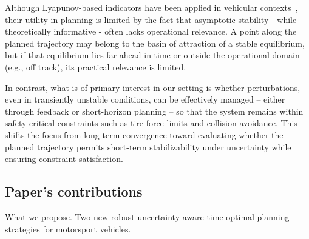 
Although Lyapunov-based indicators have been applied in vehicular contexts~\cite{Sadri:StabilityAnalysisNonlinear:2013,Meng:AnalysisGlobalCharacteristics:2022}, their utility in planning is limited by the fact that asymptotic stability - while theoretically informative - often lacks operational relevance. A point along the planned trajectory may belong to the basin of attraction of a stable equilibrium, but if that equilibrium lies far ahead in time or outside the operational domain (e.g., off track), its practical relevance is limited.
 
In contrast, what is of primary interest in our setting is whether perturbations, even in transiently unstable conditions, can be effectively managed -- either through feedback or short-horizon planning -- so that the system remains within safety-critical constraints such as tire force limits and collision avoidance. This shifts the focus from long-term convergence toward evaluating whether the planned trajectory permits short-term stabilizability under uncertainty while ensuring constraint satisfaction.


\subsection{Paper's contributions}
What we propose. Two new robust uncertainty-aware time-optimal planning strategies for motorsport vehicles.  